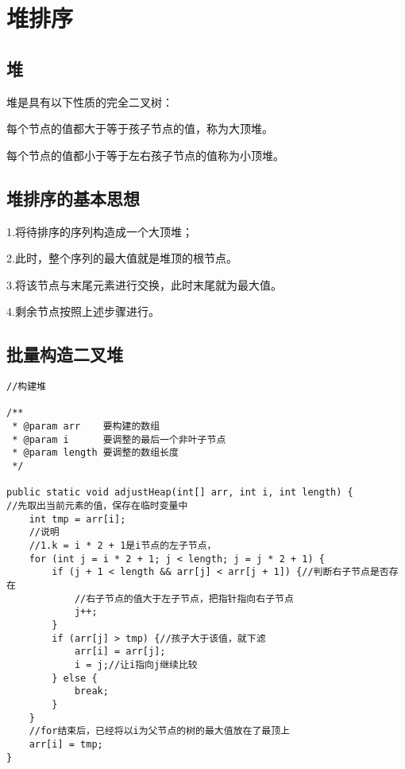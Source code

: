 \documentclass[a4paper]{report}
\begin{document}
\section{堆排序}
\subsection{堆}
堆是具有以下性质的完全二叉树：

每个节点的值都大于等于孩子节点的值，称为大顶堆。

每个节点的值都小于等于左右孩子节点的值称为小顶堆。

\subsection{堆排序的基本思想}
1.将待排序的序列构造成一个大顶堆；

2.此时，整个序列的最大值就是堆顶的根节点。

3.将该节点与末尾元素进行交换，此时末尾就为最大值。

4.剩余节点按照上述步骤进行。

\subsection{批量构造二叉堆}
\begin{lstlisting}
//构建堆

/**
 * @param arr    要构建的数组
 * @param i      要调整的最后一个非叶子节点
 * @param length 要调整的数组长度
 */

public static void adjustHeap(int[] arr, int i, int length) {
//先取出当前元素的值，保存在临时变量中
    int tmp = arr[i];
    //说明
    //1.k = i * 2 + 1是i节点的左子节点，
    for (int j = i * 2 + 1; j < length; j = j * 2 + 1) {
        if (j + 1 < length && arr[j] < arr[j + 1]) {//判断右子节点是否存在
            //右子节点的值大于左子节点，把指针指向右子节点
            j++;
        }
        if (arr[j] > tmp) {//孩子大于该值，就下滤
            arr[i] = arr[j];
            i = j;//让i指向j继续比较
        } else {
            break;
        }
    }
    //for结束后，已经将以i为父节点的树的最大值放在了最顶上
    arr[i] = tmp;
}
\end{lstlisting}
\end{document}
